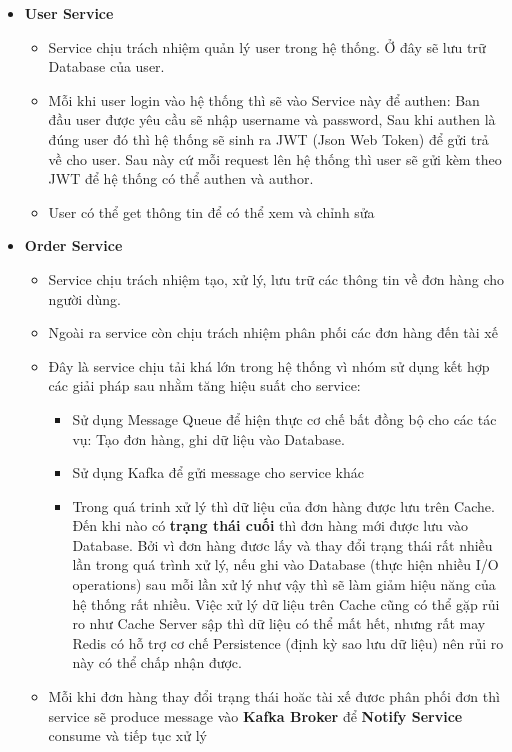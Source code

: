 		
		\begin{itemize}
			\item \textbf{User Service}
			\begin{itemize}
				\item Service chịu trách nhiệm quản lý user trong hệ thống. Ở đây sẽ lưu trữ Database của user.
				\item Mỗi khi user login vào hệ thống thì sẽ vào Service này để authen: Ban đầu user được yêu cầu sẽ nhập username và password, Sau khi authen là đúng user đó thì hệ thống sẽ sinh ra JWT (Json Web Token) để gửi trả về cho user. Sau này cứ mỗi request lên hệ thống thì user sẽ gửi kèm theo JWT để hệ thống có thể authen và author.
				\item User có thể get thông tin để có thể xem và chỉnh sửa
			\end{itemize}
			\item \textbf{Order Service}
			\begin{itemize}
				\item Service chịu trách nhiệm tạo, xử lý, lưu trữ các thông tin về đơn hàng cho người dùng.
				\item Ngoài ra service còn chịu trách nhiệm phân phối các đơn hàng đến tài xế
				\item Đây là service chịu tải khá lớn trong hệ thống vì nhóm sử dụng kết hợp các giải pháp sau nhằm tăng hiệu suất cho service: 
					\begin{itemize}
						\item Sử dụng Message Queue để hiện thực cơ chế bất đồng bộ cho các tác vụ: Tạo đơn hàng, ghi dữ liệu vào Database.
						\item Sử dụng Kafka để gửi message cho service khác
						\item Trong quá trinh xử lý thì dữ liệu của đơn hàng được lưu trên Cache. Đến khi nào có \textbf{trạng thái cuối} thì đơn hàng mới được lưu vào Database. Bởi vì đơn hàng đươc lấy và thay đổi trạng thái rất nhiều lần trong quá trình xử lý, nếu ghi vào Database (thực hiện nhiều I/O operations) sau mỗi lần xử lý như vậy thì sẽ làm giảm hiệu năng của hệ thống rất nhiều. Việc xử lý dữ liệu trên Cache cũng có thể gặp rủi ro như Cache Server sập thì dữ liệu có thể mất hết, nhưng rất may Redis có hỗ trợ cơ chế Persistence (định kỳ sao lưu dữ liệu) nên rủi ro này có thể chấp nhận được.
					\end{itemize}
				\item Mỗi khi đơn hàng thay đổi trạng thái hoăc tài xế đươc phân phối đơn thì service sẽ produce message vào \textbf{Kafka Broker} để \textbf{Notify Service} consume và tiếp tục xử lý

\end{itemize}
\end{itemize}
